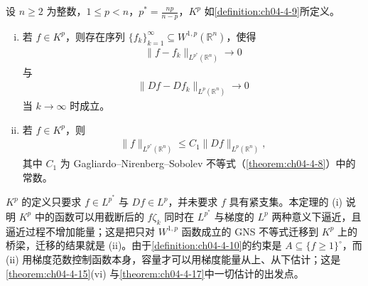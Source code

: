 \documentclass[../../main.tex]{subfiles}%
\begin{document}
\begin{theorem}[$K^p$ 中的逼近]\label{theorem:ch04-4-12}
设 $n\geqslant2$ 为整数，$1\leqslant p<n$，$p^*=\frac{np}{n-p}$，$K^p$ 如\cref{definition:ch04-4-9}所定义。%
\begin{enumerate}[(i)]
\item 若 $f\in K^p$，则存在序列 $\{f_k\}_{k=1}^{\infty}\subseteq W^{1,p}(\mathbb{R}^n)$，使得
\begin{align*}
\lVert f-f_k\rVert_{L^{p^*}(\mathbb{R}^n)}\to0
\end{align*}
与
\begin{align*}
\lVert Df-Df_k\rVert_{L^p(\mathbb{R}^n)}\to0
\end{align*}
当 $k\to\infty$ 时成立。
\item 若 $f\in K^p$，则
\begin{align*}
\lVert f\rVert_{L^{p^*}(\mathbb{R}^n)}\leqslant C_1\lVert Df\rVert_{L^p(\mathbb{R}^n)},
\end{align*}
其中 $C_1$ 为 Gagliardo--Nirenberg--Sobolev 不等式（\cref{theorem:ch04-4-8}）中的常数。%
\end{enumerate}
\end{theorem}

\begin{remark}\label{remark:ch04-thm-4-12-动机}
$K^p$ 的定义只要求 $f\in L^{p^*}$ 与 $Df\in L^p$，并未要求 $f$ 具有紧支集。本定理的 (i) 说明 $K^p$ 中的函数可以用截断后的 $f\zeta_k$ 同时在 $L^{p^*}$ 与梯度的 $L^p$ 两种意义下逼近，且逼近过程不增加能量；这是把只对 $W^{1,p}$ 函数成立的 GNS 不等式迁移到 $K^p$ 上的桥梁，迁移的结果就是 (ii)。由于\cref{definition:ch04-4-10}的约束是 $A\subseteq\{f\geqslant1\}^{\circ}$，而 (ii) 用梯度范数控制函数本身，容量才可以用梯度能量从上、从下估计；这是\cref{theorem:ch04-4-15}(vi) 与\cref{theorem:ch04-4-17}中一切估计的出发点。%
\end{remark}
\end{document}

